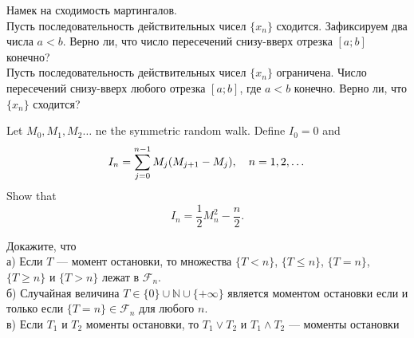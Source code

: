 \begin{solution}
\begin{solution}
\begin{solution}
\begin{solution}
\begin{solution}
\begin{solution}
\begin{solution}
\begin{solution}
\begin{solution}
{\begin{problem}
 Намек на сходимость мартингалов. \\
Пусть последовательность действительных чисел $\{x_{n}\}$
сходится. Зафиксируем два числа $a<b$. Верно ли, что число
пересечений снизу-вверх отрезка $[a;b]$ конечно? \\
Пусть последовательность действительных чисел $\{x_{n}\}$
ограничена. Число пересечений снизу-вверх любого отрезка $[a;b]$,
где $a<b$ конечно. Верно ли, что $\{x_{n}\}$ сходится? 
\end{problem} 
\begin{solution} 

\end{solution}

\begin{problem}
 Let $M_0,M_1,M_2\dots$ ne the symmetric random walk. Define $I_0=0$ and
\[
I_n=\sum\limits_{j=0}^{n-1} M_j(M_{j+1}-M_j),\quad n=1,2,\dots
\]
\ni Show that
\[
I_n=\frac{1}{2}M_n^2-\frac{n}{2}.
\]
\end{problem} 
\begin{solution} 

\end{solution}

\begin{problem}
 Докажите, что \\
а) Если $T$ --- момент остановки, то множества $\{T<n\}$, $\{T\le
n\}$, $\{T=n\}$, $\{T\ge n\}$ и $\{T>n\}$ лежат в
$\mathcal{F}_{n}$. \\
б) Случайная величина $T\in \{0\}\cup \mathbb{N}\cup \{+\infty\}$
является моментом остановки если и только если $\{T=n\}\in
\mathcal{F}_{n}$ для любого $n$. \\
в) Если $T_{1}$ и $T_{2}$ моменты остановки, то $T_{1}\vee T_{2}$
и $T_{1}\wedge T_{2}$ --- моменты остановки 
\end{problem} 
\begin{solution} 

\end{solution}

}
\end{solution}
\end{solution}
\end{solution}
\end{solution}
\end{solution}
\end{solution}
\end{solution}
\end{solution}
\end{solution}
